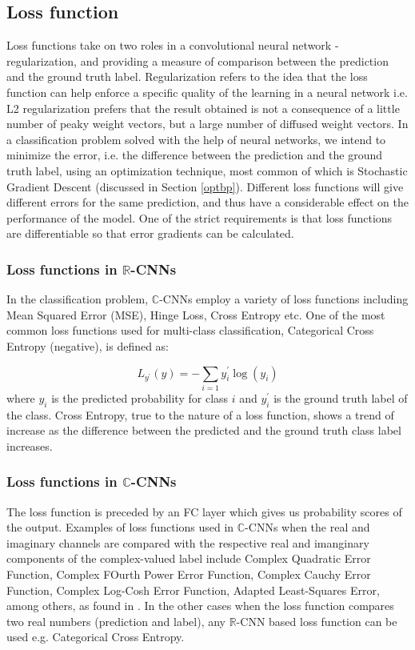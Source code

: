	 \subsection{Loss function}
 Loss functions take on two roles in a convolutional neural network - regularization, and providing a measure of comparison between the prediction and the ground truth label. Regularization refers to the idea that the loss function can help enforce a specific quality of the learning in a neural network i.e. L2 regularization prefers that the result obtained is not a consequence of a little number of peaky weight vectors, but a large number of diffused weight vectors. In a classification problem solved with the help of neural networks, we intend to minimize the error, i.e. the difference between the prediction and the ground truth label, using an optimization technique, most common of which is Stochastic Gradient Descent (discussed in Section \ref{optbp}). Different loss functions will give different errors for the same prediction, and thus have a considerable effect on the performance of the model. One of the strict requirements is that loss functions are differentiable so that error gradients can be calculated.
 
 
 
 \subsubsection{Loss functions in $\mathbb{R}$-CNNs}
 In the classification problem, $\mathbb{C}$-CNNs employ a variety of loss functions including Mean Squared Error (MSE), Hinge Loss, Cross Entropy etc. One of the most common loss functions used for multi-class classification, Categorical Cross Entropy (negative), is defined as:
 
  \begin{equation}\label{rloss}
  L_{y^{'}}(y) = - \sum_{i=1} y_{i}^{'} \log(y_{i})
 \end{equation}
 where $y_{i}$ is the predicted probability for class $i$ and $y_{i}^{'}$ is the ground truth label of the class. Cross Entropy, true to the nature of a loss function, shows a trend of increase as the difference between the predicted and the ground truth class label increases.
 
 
 
 \subsubsection{Loss functions in $\mathbb{C}$-CNNs}
 The loss function is preceded by an FC layer which gives us probability scores of the output. Examples of loss functions used in $\mathbb{C}$-CNNs when the real and imaginary channels are compared with the respective real and imanginary components of the complex-valued label include Complex Quadratic Error Function, Complex FOurth Power Error Function, Complex Cauchy Error Function, Complex Log-Cosh Error Function, Adapted Least-Squares Error, among others, as found in \cite{hansch2009classification}\cite{polsarzhang2017complex}\cite{hansch2010complex}. 
 In the other cases when the loss function compares two real numbers (prediction and label), any $\mathbb{R}$-CNN based loss function can be used e.g. Categorical Cross Entropy.    
 

